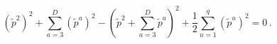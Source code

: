 \begin{equation}
\label{vequation} (\tilde p^2)^2+\sum_{a=3}^D(\tilde p^a)^2  - \left(\tilde
p^2+\sum_{a=3}^D\tilde p^a\right)^2 +\frac{1}{2}\sum_{u=1}^q (\tilde p^u)^2=0
\, .
\end{equation} 
